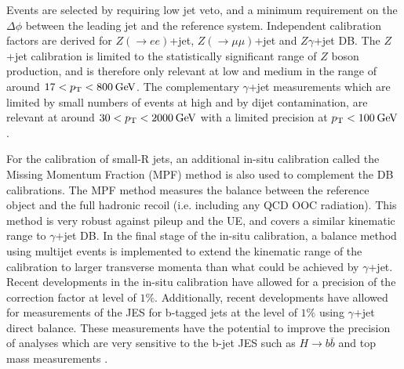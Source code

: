 Events are selected by requiring low \pt jet veto, and a minimum requirement on the $\Delta\phi$ between the leading jet and the reference system. Independent calibration factors are derived for $Z(\rightarrow ee)$+jet, $Z(\rightarrow \mu\mu)$+jet and $Z\gamma$+jet DB. The $Z$+jet calibration is limited to the statistically significant \pt range of $Z$ boson production, and is therefore only relevant at low and medium \pt in the range of around $17 < p_{\text{T}} < 800\hspace{2pt}\text{Ge\kern -0.1em V}$. The complementary $\gamma$+jet measurements which are limited by small numbers of events at high \pt and by dijet contamination, are relevant at around $30<p_{\text{T}}<2000\hspace{2pt}\text{Ge\kern -0.1em V}$ with a limited precision at $p_{\text{T}}<100\hspace{2pt}\text{Ge\kern -0.1em V}$.

For the calibration of small-R jets, an additional in-situ calibration called the Missing Momentum Fraction (MPF) method is also used to complement the DB calibrations. The MPF method measures the \pt balance between the reference object and the full hadronic recoil (i.e. including any QCD OOC radiation). This method is very robust against pileup and the UE, and covers a similar kinematic range to $\gamma$+jet DB. In the final stage of the in-situ calibration, a \pt balance method using multijet events is implemented to extend the kinematic range of the calibration to larger transverse momenta than what could be achieved by $\gamma$+jet. Recent developments in the in-situ calibration have allowed for a precision of the correction factor at level of $1\%$. Additionally, recent developments have allowed for measurements of the JES for b-tagged jets at the level of $1\%$ using $\gamma$+jet direct balance. These measurements have the potential to improve the precision of analyses which are very sensitive to the b-jet JES such as $H\rightarrow b\bar{b}$ and top mass measurements \cite{Atlas:smallrnewtechniques,Atlas:largercali,Atlas:smallrcali}.

